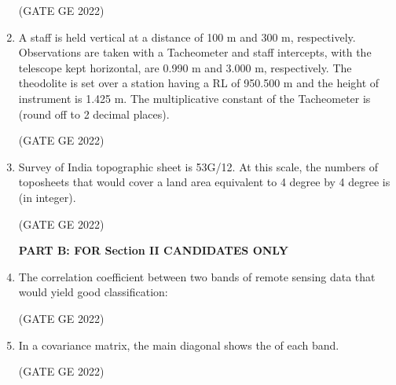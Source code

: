 \documentclass[journal,12pt,onecolumn]{IEEEtran}
\theoremstyle{remark}
\begin{document}
\begin{enumerate}
\hfill (GATE GE 2022)

\item A staff is held vertical at a distance of 100 m and 300 m, respectively. Observations are taken with a Tacheometer and staff intercepts, with the telescope kept horizontal, are 0.990 m and 3.000 m, respectively. The theodolite is set over a station having a RL of 950.500 m and the height of instrument is 1.425 m. The multiplicative constant of the Tacheometer is \makebox[1cm]{\hrulefill} (round off to 2 decimal places).

\hfill (GATE GE 2022)

\item Survey of India topographic sheet is 53G/12. At this scale, the numbers of toposheets that would cover a land area equivalent to 4 degree by 4 degree is \makebox[1cm]{\hrulefill} (in integer).

\hfill (GATE GE 2022)

\textbf{PART B: FOR Section II CANDIDATES ONLY }

\item The correlation coefficient between two bands of remote sensing data that would yield good classification:

\hfill (GATE GE 2022)

\begin{enumerate}
\end{enumerate}

\item In a covariance matrix, the main diagonal shows the \makebox[1cm]{\hrulefill} of each band.

\hfill (GATE GE 2022)

\begin{enumerate}
\end{enumerate}


\end{enumerate}
\end{document}
